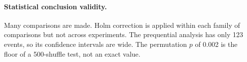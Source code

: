 \paragraph{Statistical conclusion validity.} Many comparisons are made. Holm correction is applied
within each family of comparisons but not across experiments. The prequential analysis has only 123
events, so its confidence intervals are wide. The permutation $p$ of 0.002 is the floor of a
500-shuffle test, not an exact value.
